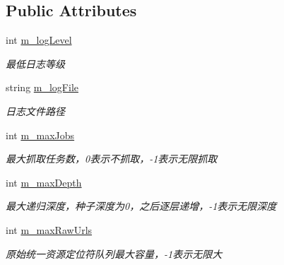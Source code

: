 \subsection*{Public Attributes}
\begin{DoxyCompactItemize}
\item 
int \hyperlink{class_configurator_a48b66a5bd8038dd8a186c295111ed7ce}{m\+\_\+log\+Level}
\begin{DoxyCompactList}\small\item\em 最低日志等级 \end{DoxyCompactList}\item 
\mbox{\label{class_configurator_adac0a4036fa93d7ea780e586befd5d32}} 
string \hyperlink{class_configurator_adac0a4036fa93d7ea780e586befd5d32}{m\+\_\+log\+File}
\begin{DoxyCompactList}\small\item\em 日志文件路径 \end{DoxyCompactList}\item 
\mbox{\label{class_configurator_a70acfa6e6928b1aab0ae7c9444b1a46e}} 
int \hyperlink{class_configurator_a70acfa6e6928b1aab0ae7c9444b1a46e}{m\+\_\+max\+Jobs}
\begin{DoxyCompactList}\small\item\em 最大抓取任务数，0表示不抓取，-\/1表示无限抓取 \end{DoxyCompactList}\item 
\mbox{\label{class_configurator_a20f4111bbd490936746422cb57cf72bd}} 
int \hyperlink{class_configurator_a20f4111bbd490936746422cb57cf72bd}{m\+\_\+max\+Depth}
\begin{DoxyCompactList}\small\item\em 最大递归深度，种子深度为0，之后逐层递增，-\/1表示无限深度 \end{DoxyCompactList}\item 
\mbox{\label{class_configurator_a219d7b0dc18eb5b11fdbc5c0f83da32c}} 
int \hyperlink{class_configurator_a219d7b0dc18eb5b11fdbc5c0f83da32c}{m\+\_\+max\+Raw\+Urls}
\begin{DoxyCompactList}\small\item\em 原始统一资源定位符队列最大容量，-\/1表示无限大 \end{DoxyCompactList}\item 
\mbox{\label{class_configurator_a3d64cd25dbfee1edf4d26fd642b629f3}} 

\end{DoxyCompactItemize}
